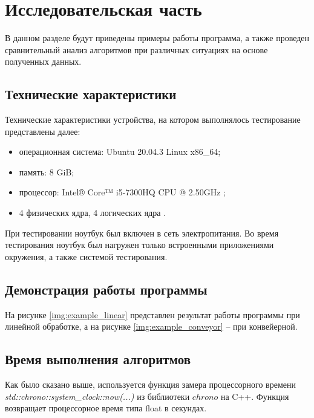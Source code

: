 \chapter{Исследовательская часть}

В данном разделе будут приведены примеры работы программа, а также проведен сравнительный анализ алгоритмов при различных ситуациях на основе полученных данных.

\section{Технические характеристики}

Технические характеристики устройства, на котором выполнялось тестирование представлены далее:

\begin{itemize}
    \item операционная система: Ubuntu 20.04.3 \cite{ubuntu} Linux \cite{linux} x86\_64;
    \item память: 8 GiB;
    \item процессор: Intel® Core™ i5-7300HQ CPU @ 2.50GHz \cite{intel};
    \item 4 физических ядра, 4 логических ядра \cite{intel}.
\end{itemize}

При тестировании ноутбук был включен в сеть электропитания. Во время тестирования ноутбук был нагружен только встроенными приложениями окружения, а также системой тестирования.

\section{Демонстрация работы программы}

На рисунке \ref{img:example_linear} представлен результат работы программы при линейной обработке, а на рисунке \ref{img:example_conveyor} -- при конвейерной.

\clearpage

\section{Время выполнения алгоритмов}

Как было сказано выше, используется функция замера процессорного времени \textit{std::chrono::system\_clock::now(...)} из библиотеки $chrono$ на C++. Функция возвращает процессорное время типа float в секундах.

